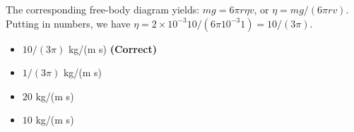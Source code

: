\documentclass[10pt]{article}
\begin{document}
\begin{enumerate}
The corresponding free-body diagram yields: $mg = 6\pi r\eta v$, or $\eta = mg/(6\pi r v)$.  Putting in numbers, we have $\eta = 2 \times 10^{-3} 10 / (6\pi 10^{-3} 1) = 10/(3\pi)$.
\begin{itemize}
\item $10/(3\pi)$ kg/(m s) \textbf{(Correct)}
\item $1/(3\pi)$ kg/(m s)
\item $20$ kg/(m s)
\item $10$ kg/(m s)
\end{itemize}
\end{enumerate}
\end{document}
